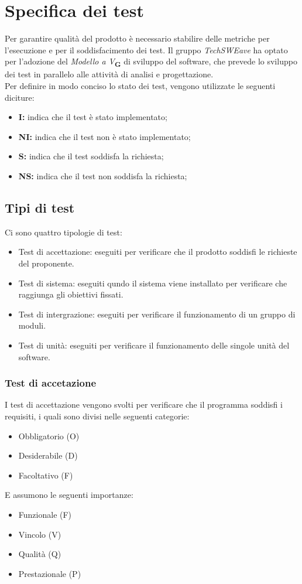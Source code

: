 \section{Specifica dei test}
Per garantire qualità del prodotto è necessario stabilire delle metriche per l’esecuzione e per il soddisfacimento dei test. 
Il gruppo \textit{TechSWEave} ha optato per l'adozione del \textit{Modello a V}\textsubscript{\textbf{G}} di sviluppo del software, che 
prevede lo sviluppo dei test in parallelo alle attività di analisi e progettazione.\\
Per definire in modo conciso lo stato dei test, vengono utilizzate le seguenti diciture:
\begin{itemize}
    \item \textbf{I:} indica che il test è stato implementato;
    \item \textbf{NI:} indica che il test non è stato implementato;
    \item \textbf{S:} indica che il test soddisfa la richiesta;
    \item \textbf{NS:} indica che il test non soddisfa la richiesta;
\end{itemize}
\subsection{Tipi di test}
Ci sono quattro tipologie di test:
\begin{itemize}
    \item Test di accettazione: eseguiti per verificare che il prodotto soddisfi le richieste del proponente.
    \item Test di sistema: eseguiti qundo il sistema viene installato per verificare che raggiunga gli obiettivi fissati.
    \item Test di intergrazione: eseguiti per verificare il funzionamento di un gruppo di moduli.
    \item Test di unit\`a: eseguiti per verificare il funzionamento delle singole unit\`a del software.
\end{itemize}
\subsubsection{Test di accetazione}
I test di accettazione vengono svolti per verificare che il programma soddisfi i requisiti, i quali sono divisi nelle seguenti categorie:
\begin{itemize}
    \item Obbligatorio (O)
    \item Desiderabile (D)
    \item Facoltativo (F)
\end{itemize}
E assumono le seguenti importanze:
\begin{itemize}
    \item Funzionale (F)
    \item Vincolo (V)
    \item Qualit\`a (Q)
    \item Prestazionale (P)
\end{itemize}


